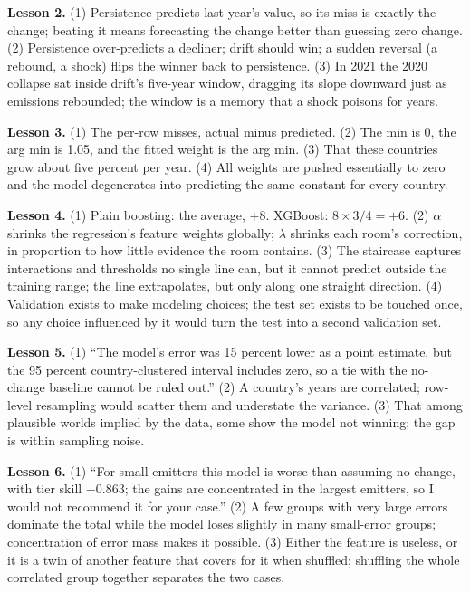 \documentclass[11pt]{article}
\begin{document}
\textbf{Lesson 2.} (1) Persistence predicts last year's value, so its
miss is exactly the change; beating it means forecasting the change
better than guessing zero change. (2) Persistence over-predicts a
decliner; drift should win; a sudden reversal (a rebound, a shock) flips
the winner back to persistence. (3) In 2021 the 2020 collapse sat inside
drift's five-year window, dragging its slope downward just as emissions
rebounded; the window is a memory that a shock poisons for years.

\textbf{Lesson 3.} (1) The per-row misses, actual minus predicted. (2)
The min is 0, the arg min is 1.05, and the fitted weight is the arg min.
(3) That these countries grow about five percent per year. (4) All
weights are pushed essentially to zero and the model degenerates into
predicting the same constant for every country.

\textbf{Lesson 4.} (1) Plain boosting: the average, $+8$. XGBoost:
$8 \times 3/4 = +6$. (2) $\alpha$ shrinks the regression's feature
weights globally; $\lambda$ shrinks each room's correction, in proportion
to how little evidence the room contains. (3) The staircase captures
interactions and thresholds no single line can, but it cannot predict
outside the training range; the line extrapolates, but only along one
straight direction. (4) Validation exists to make modeling choices; the
test set exists to be touched once, so any choice influenced by it would
turn the test into a second validation set.

\textbf{Lesson 5.} (1) ``The model's error was 15 percent lower as a
point estimate, but the 95 percent country-clustered interval includes
zero, so a tie with the no-change baseline cannot be ruled out.'' (2) A
country's years are correlated; row-level resampling would scatter them
and understate the variance. (3) That among plausible worlds implied by
the data, some show the model not winning; the gap is within sampling
noise.

\textbf{Lesson 6.} (1) ``For small emitters this model is worse than
assuming no change, with tier skill $-0.863$; the gains are concentrated
in the largest emitters, so I would not recommend it for your case.''
(2) A few groups with very large errors dominate the total while the
model loses slightly in many small-error groups; concentration of error
mass makes it possible. (3) Either the feature is useless, or it is a
twin of another feature that covers for it when shuffled; shuffling the
whole correlated group together separates the two cases.



\end{document}
